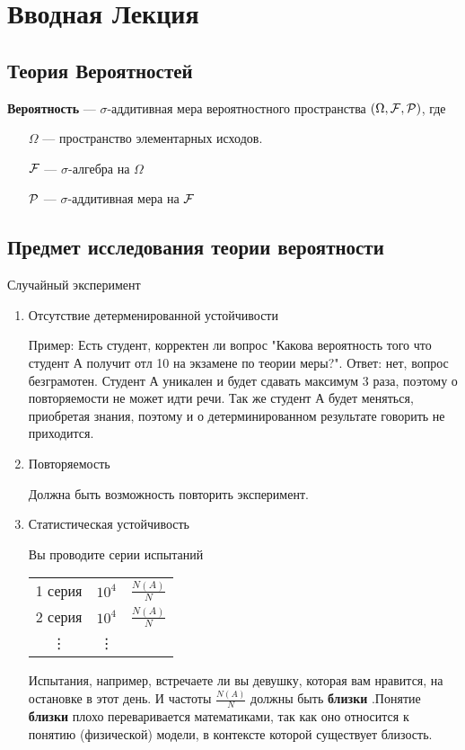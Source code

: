 \section{Вводная Лекция}

\subsection{Теория Вероятностей}

\begin{definition}
	\textbf{Вероятность} --- $\sigma$-аддитивная мера вероятностного пространства 
	$(\Omega, \mathcal{F}, \mathcal{P})$, где
	\begin{enumerate}
		\item[$\Omega$] --- пространство элементарных исходов.
		\item[$\mathcal{F}$]  --- $\sigma$-алгебра на $\Omega$
		\item[$\mathcal{P}$] --- $\sigma$-аддитивная мера на $\mathcal{F}$
	\end{enumerate}
\end{definition}

\subsection{Предмет исследования теории вероятности}

Случайный эксперимент
\begin{enumerate}
	\item Отсутствие детерменированной устойчивости

		Пример: Есть студент, корректен ли вопрос "Какова вероятность того что студент А получит отл 10 на экзамене по теории меры?". Ответ: нет, вопрос безграмотен. Студент А уникален и будет сдавать максимум 3 раза, поэтому о повторяемости не может идти речи. Так же студент А будет меняться, приобретая знания, поэтому и о детерминированном результате говорить не приходится.

	\item Повторяемость

		Должна быть возможность повторить эксперимент.

	\item Статистическая устойчивость

		Вы проводите серии испытаний
		\begin{center}
		\begin{tabular}{ c c c }
			1 серия & $10^4$ & $\frac{N(A)}{N}$ \\
			2 серия & $10^4$ & $\frac{N(A)}{N}$ \\
			\vdots  & \vdots &\\
		\end{tabular}
		\end{center}
		Испытания, например, встречаете ли вы девушку, которая вам нравится, на остановке в этот день.
		И частоты  $\frac{N(A)}{N}$ должны быть \textbf{близки} .Понятие \textbf{близки} плохо переваривается математиками, так как оно относится к понятию (физической) модели, в контексте которой существует близость.
		
\end{enumerate}

